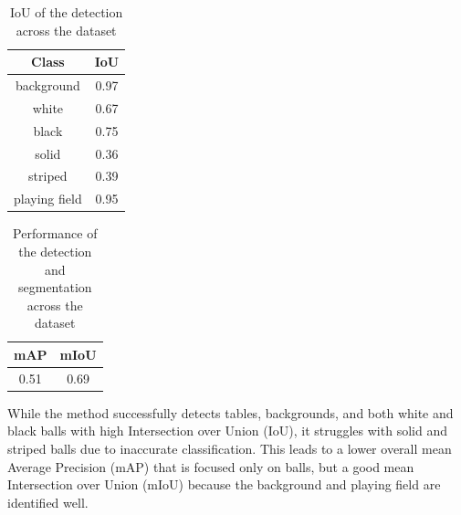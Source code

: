 \begin{table}[H]
	\centering
    \begin{tabular}{|c|c|}
        \hline
        \textbf{Class} & \textbf{IoU} \\
        \hline
        background & 0.97 \\
        \hline
        white & 0.67 \\
        \hline
        black & 0.75 \\
        \hline
        solid & 0.36 \\
        \hline
        striped & 0.39 \\
        \hline
        playing field & 0.95 \\
        \hline
    \end{tabular}
    \caption{IoU of the detection across the dataset}
    \label{tab: IoU across dataset}
\end{table}

\begin{table}[H]
	\centering
    \begin{tabular}{|c|c|}
        \hline
        \textbf{mAP} & \textbf{mIoU} \\
        \hline
        0.51 & 0.69 \\
        \hline
    \end{tabular}
    \caption{Performance of the detection and segmentation across the dataset}
    \label{tab: performance across dataset}
\end{table}
While the method successfully detects tables, backgrounds, and both white and black balls with high Intersection
over Union (IoU), it struggles with solid and striped balls due to inaccurate classification.
This leads to a lower overall mean Average Precision (mAP) that is focused only on balls,
but a good mean Intersection over Union (mIoU) because the background and playing field are identified well.
